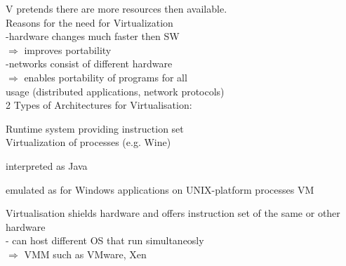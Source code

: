 V pretends there are more resources then available.\\

Reasons for the need for Virtualization\\
-hardware changes much faster then SW\\
$\Rightarrow$ improves portability\\
-networks consist of different hardware\\
$\Rightarrow$ enables portability of programs for all\\
usage (distributed applications, network protocols)\\

2 Types of Architectures for Virtualisation:\\
\begin{compactenum}
\item Runtime system providing instruction set\\
    Virtualization of processes (e.g. Wine)\\
	\begin{compactitem}
	\item interpreted as Java
	\item emulated as for Windows applications on UNIX-platform processes VM
	\end{compactitem}
\item Virtualisation shields hardware and offers instruction set of the same or other hardware\\
- can host different OS that run simultaneosly\\
$\Rightarrow$ VMM such as VMware, Xen\\


\end{compactenum}


